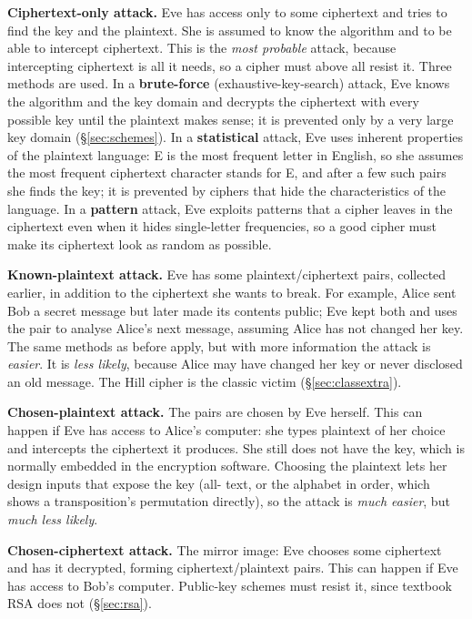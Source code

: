 \textbf{Ciphertext-only attack.} Eve has access only to some ciphertext and tries to find the key and the plaintext. She is assumed to know the algorithm and to be able to intercept ciphertext. This is the \emph{most probable} attack, because intercepting ciphertext is all it needs, so a cipher must above all resist it. Three methods are used. In a \textbf{brute-force} (exhaustive-key-search) attack, Eve knows the algorithm and the key domain and decrypts the ciphertext with every possible key until the plaintext makes sense; it is prevented only by a very large key domain (\S\ref{sec:schemes}). In a \textbf{statistical} attack, Eve uses inherent properties of the plaintext language: E is the most frequent letter in English, so she assumes the most frequent ciphertext character stands for E, and after a few such pairs she finds the key; it is prevented by ciphers that hide the characteristics of the language. In a \textbf{pattern} attack, Eve exploits patterns that a cipher leaves in the ciphertext even when it hides single-letter frequencies, so a good cipher must make its ciphertext look as random as possible.

\textbf{Known-plaintext attack.} Eve has some plaintext/ciphertext pairs, collected earlier, in addition to the ciphertext she wants to break. For example, Alice sent Bob a secret message but later made its contents public; Eve kept both and uses the pair to analyse Alice's next message, assuming Alice has not changed her key. The same methods as before apply, but with more information the attack is \emph{easier}. It is \emph{less likely}, because Alice may have changed her key or never disclosed an old message. The Hill cipher is the classic victim (\S\ref{sec:classextra}).

\textbf{Chosen-plaintext attack.} The pairs are chosen by Eve herself. This can happen if Eve has access to Alice's computer: she types plaintext of her choice and intercepts the ciphertext it produces. She still does not have the key, which is normally embedded in the encryption software. Choosing the plaintext lets her design inputs that expose the key (all- text, or the alphabet in order, which shows a transposition's permutation directly), so the attack is \emph{much easier}, but \emph{much less likely}.

\textbf{Chosen-ciphertext attack.} The mirror image: Eve chooses some ciphertext and has it decrypted, forming ciphertext/plaintext pairs. This can happen if Eve has access to Bob's computer. Public-key schemes must resist it, since textbook RSA does not (\S\ref{sec:rsa}).

